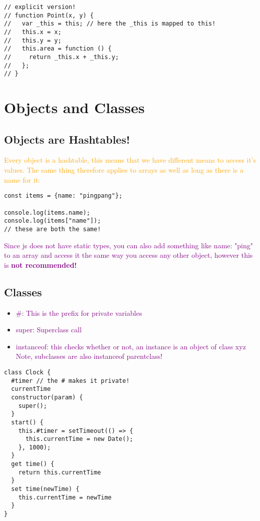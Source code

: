 \documentclass[main.tex,fontsize=6pt,paper=a4,paper=landscape,DIV=calc,]{scrartcl}
\begin{document}
\begin{multicols*}{4}
\begin{lstlisting}
// explicit version!
// function Point(x, y) {
//   var _this = this; // here the _this is mapped to this!
//   this.x = x;
//   this.y = y;
//   this.area = function () {
//     return _this.x + _this.y;
//   };
// }
\end{lstlisting}
\vspace{2mm}


\section{Objects and Classes}

\subsection{Objects are Hashtables!} 
\textcolor{orange}{Every object is a hashtable, this means that we have different means to access it's values. \newline
The same thing therefore applies to arrays as well as long as there is a name for it:}\newline
\vspace{-2mm}
\begin{lstlisting}
const items = {name: "pingpang"};

console.log(items.name);
console.log(items["name"]);
// these are both the same!
\end{lstlisting}
\vspace{2mm}
\textcolor{purple}{Since js does not have static types, you can also add something like name: "ping" to an array and access it the same way you access any other object, however this is \textbf{not recommended!}}

\subsection{Classes} 

\begin{itemize}
\item \textcolor{purple}{\#: This is the prefix for private variables}
\item \textcolor{purple}{super: Superclass call}
\item \textcolor{purple}{instanceof: this checks whether or not,\newline
  an instance is an object of class xyz\newline
Note, subclasses are also instanceof parentclass!}
\end{itemize}
\vspace{-2mm}
\begin{lstlisting}
class Clock {
  #timer // the # makes it private!
  currentTime
  constructor(param) {
    super();
  }
  start() {
    this.#timer = setTimeout(() => { 
      this.currentTime = new Date();
    }, 1000);
  }
  get time() {
    return this.currentTime
  }
  set time(newTime) {
    this.currentTime = newTime
  }
}


\end{lstlisting}
\end{multicols*}
\end{document}
